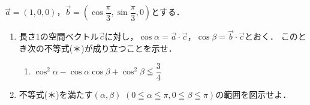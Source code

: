 \documentclass[../../main.tex]{subfiles}
\begin{document}
$\vec{a}=(1,0,0)$，$\displaystyle\vec{b}=\left(\cos\dfrac{\pi}{3},\sin\dfrac{\pi}{3},0\right)$とする．
\begin{enumerate}
  \item 長さ1の空間ベクトル$\vec{c}$に対し，$\cos\alpha=\vec{a}\cdot\vec{c}$，$\cos\beta=\vec{b}\cdot\vec{c}$とおく．
    このとき次の不等式(＊)が成り立つことを示せ．
    \begin{enumerate}
      \item[(＊)]$\displaystyle\cos^2\alpha-\cos\alpha\cos\beta+\cos^2\beta\leqq\dfrac{3}{4}$
    \end{enumerate}
  \item 不等式(＊)を満たす$(\alpha,\beta)$ $(0\leqq\alpha\leqq\pi,0\leqq\beta\leqq\pi)$の範囲を図示せよ．
\end{enumerate}
\end{document}
